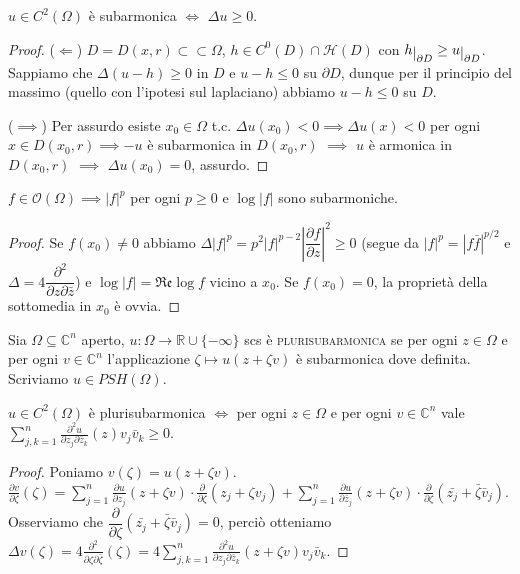 \begin{prop}
  $u \in C^2(\Omega)$ è subarmonica $\iff$ $\Delta u \ge 0$.
\end{prop}

\begin{proof}
  ($\Leftarrow$) $D=D(x,r) \subset\subset \Omega$, $h \in C^0(D)\cap \mathcal{H}(D)$ con $h\restrict{\partial D} \ge u\restrict{\partial D}$. Sappiamo che $\Delta(u-h) \ge 0$ in $D$ e $u-h \le 0$ su $\partial D$, dunque per il principio del massimo (quello con l'ipotesi sul laplaciano) abbiamo $u-h \le 0$ su $D$.

  ($\implies$) Per assurdo esiste $x_0 \in \Omega$ t.c. $\Delta u(x_0)<0 \implies \Delta u(x)<0$ per ogni $x \in D(x_0,r) \implies -u$ è subarmonica in $D(x_0,r)$ $\implies$ $u$ è armonica in $D(x_0,r)$ $\implies$ $\Delta u(x_0)=0$, assurdo.
\end{proof}

\begin{cor}
  $f \in \mathcal{O}(\Omega) \implies |f|^p$ per ogni $p \ge 0$ e $\log{|f|}$ sono subarmoniche.
\end{cor}

\begin{proof}
  Se $f(x_0)\not=0$ abbiamo $\Delta|f|^p=p^2|f|^{p-2}\left|\dfrac{\partial f}{\partial z}\right|^2 \ge 0$ (segue da $|f|^p=|f\bar{f}|^{p/2}$ e $\Delta=4\dfrac{\partial^2}{\partial z\partial\bar{z}}$) e $\log{|f|}=\mathfrak{Re}\log{f}$ vicino a $x_0$.
  Se $f(x_0)=0$, la proprietà della sottomedia in $x_0$ è ovvia.
\end{proof}

\begin{defn}
  Sia $\Omega \subseteq \mathbb{C}^n$ aperto, $u:\Omega \longrightarrow \mathbb{R}\cup\{-\infty\}$ scs è \textsc{plurisubarmonica} se per ogni $z \in \Omega$ e per ogni $v \in \mathbb{C}^n$ l'applicazione $\zeta \longmapsto u(z+\zeta v)$ è subarmonica dove definita. Scriviamo $u \in PSH(\Omega)$.
\end{defn}

\begin{prop}
  $u \in C^2(\Omega)$ è plurisubarmonica $\iff$ per ogni $z \in \Omega$ e per ogni $v \in \mathbb{C}^n$ vale $\displaystyle \sum_{j,k=1}^n \frac{\partial^2 u}{\partial z_j\partial\bar{z}_k}(z)v_j\bar{v}_k \ge 0$.
\end{prop}

\begin{proof}
  Poniamo $v(\zeta)=u(z+\zeta v)$. $\displaystyle \frac{\partial v}{\partial\zeta}(\zeta)=\sum_{j=1}^n \frac{\partial u}{\partial z_j}(z+\zeta v) \cdot \frac{\partial}{\partial\zeta}(z_j+\zeta v_j)+\sum_{j=1}^n\frac{\partial u}{\partial\bar{z}_j}(z+\zeta v)\cdot \frac{\partial}{\partial\zeta}(\bar{z_j}+\bar{\zeta}\bar{v}_j)$.
  Osserviamo che $\dfrac{\partial}{\partial\zeta}(\bar{z_j}+\bar{\zeta}\bar{v}_j)=0$, perciò otteniamo $\displaystyle \Delta v(\zeta)=4\frac{\partial^2}{\partial\zeta\partial\bar{\zeta}}(\zeta)=4\sum_{j,k=1}^n \frac{\partial^2 u}{\partial z_j\partial\bar{z}_k}(z+\zeta v)v_j\bar{v}_k$.
\end{proof}

